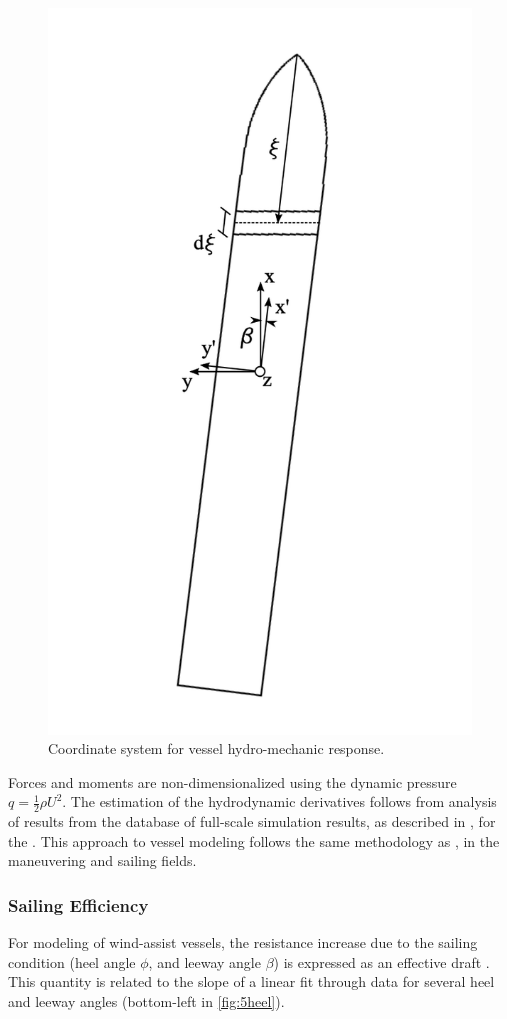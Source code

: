 \documentclass[twoside,twocolumn]{article}
\begin{document}
\begin{figure}[!ht]
	\centering
	\includegraphics[width=.7\columnwidth]{images/cut_coordinates.png}  %
	\caption{Coordinate system for vessel hydro-mechanic response.}
	\label{fig:cutcoord}
\end{figure}

Forces and moments are non-dimensionalized using the dynamic pressure $q=\frac{1}{2}\rho U^2$. The estimation of the hydrodynamic derivatives follows from analysis of results from the database of full-scale simulation results, as described in \cite{Kolk18c,Kolk19d}, for the \DWA. This approach to vessel modeling follows the same methodology as \citet{Tsakonas1959,Jacobs1966,Inoue1981,Keuning1998,Tox11}, in the maneuvering and sailing fields.

\subsubsection{Sailing Efficiency}
For modeling of wind-assist vessels, the resistance increase due to the sailing condition (heel angle $\phi$, and leeway angle $\beta$) is expressed as an effective draft \Te. This quantity is related to the slope of a linear fit through data for several heel and leeway angles (bottom-left in \cref{fig:5heel}).
\end{document}
